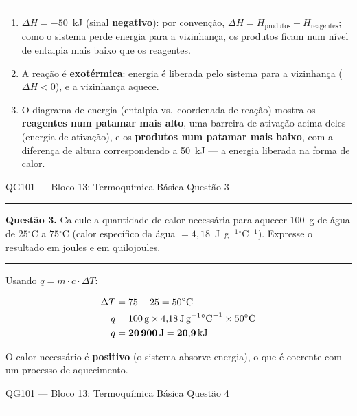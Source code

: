 \documentclass[10pt,a4paper]{article}
\newcommand{\oC}{$^\circ$C}
\newcommand{\questaoheader}[1]{%
  \begin{center}
  {\small\sffamily QG101 --- Bloco 13: Termoquímica Básica
  \hfill Questão #1}
  \end{center}
  \vspace{-0.3cm}
  \noindent\rule{\textwidth}{0.6pt}
  \vspace{0.1cm}
}
\newcommand{\resolucaosep}{%
  \vspace{0.4cm}
  \noindent\rule{\textwidth}{0.4pt}
  \vspace{0.1cm}

  \noindent{\bf Resolução:}
  \vspace{0.2cm}
}
\begin{document}
\resolucaosep

\begin{enumerate}
  \item $\Delta H = -50$~kJ (sinal \textbf{negativo}): por convenção,
        $\Delta H = H_{\text{produtos}} - H_{\text{reagentes}}$; como o
        sistema perde energia para a vizinhança, os produtos ficam num
        nível de entalpia mais baixo que os reagentes.

  \item A reação é \textbf{exotérmica}: energia é liberada pelo sistema
        para a vizinhança ($\Delta H < 0$), e a vizinhança aquece.

  \item O diagrama de energia (entalpia vs.\ coordenada de reação) mostra
        os \textbf{reagentes num patamar mais alto}, uma barreira de
        ativação acima deles (energia de ativação), e os \textbf{produtos
        num patamar mais baixo}, com a diferença de altura correspondendo
        a 50~kJ --- a energia liberada na forma de calor.
\end{enumerate}

\clearpage

\questaoheader{3}

\noindent\textbf{Questão 3.}
Calcule a quantidade de calor necessária para aquecer $100$~g de água de
$25$\oC{} a $75$\oC{} (calor específico da água
$= 4{,}18$~J~g$^{-1}$\oC$^{-1}$). Expresse o resultado em joules e em
quilojoules.

\resolucaosep

Usando $q = m \cdot c \cdot \Delta T$:

\begin{align*}
\Delta T &= 75 - 25 = 50\text{\oC}\\
q &= 100\,\text{g} \times 4{,}18\,\text{J\,g}^{-1}\text{\oC}^{-1}
     \times 50\text{\oC}\\
q &= \mathbf{20\,900\,\text{J}} = \mathbf{20{,}9\,\text{kJ}}
\end{align*}

O calor necessário é \textbf{positivo} (o sistema absorve energia), o que
é coerente com um processo de aquecimento.

\clearpage

\questaoheader{4}
\end{document}
